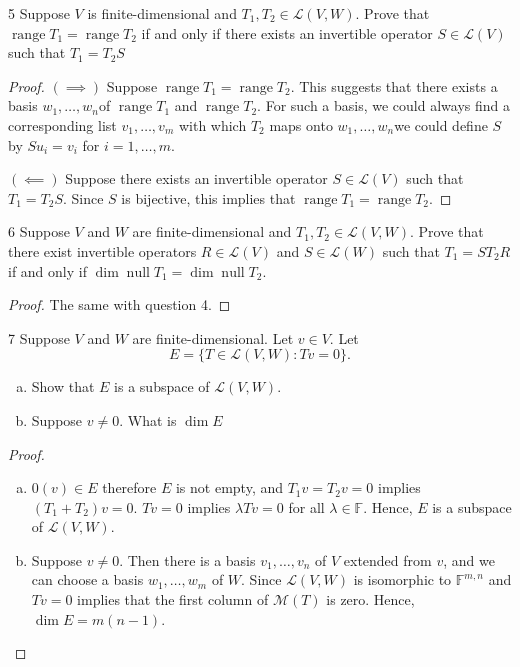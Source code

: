 \documentclass{article}
\newenvironment{problem}[1]{\begin{prob*}{#1}{}}{\end{prob*}}
\newcommand{\F}{\mathbb{F}}
\DeclareMathOperator{\Null}{null}
\DeclareMathOperator{\Range}{range}
\begin{document}
\newpage

\begin{problem}{5}
Suppose $V$ is finite-dimensional and $T_1, T_2 \in \mathcal{L}(V,W)$. Prove that $\Range T_1 = \Range T_2$ if and only if there exists an invertible operator $S \in \mathcal{L}(V)$ such that $T_1 = T_2S$
\end{problem}
\begin{proof}
	$(\implies)$ Suppose $\Range T_1 = \Range T_2$. This suggests that there exists a basis $w_1, \ldots ,w_n$of $\Range T_1$ and $\Range T_2$. For such a basis, we could always find a corresponding list $v_1, \ldots ,v_m$ with which $T_2$ maps onto $w_1, \ldots ,w_n$we could define $S$ by $Su_i = v_i$ for $i = 1, \ldots, m$.

	$(\impliedby)$ Suppose there exists an invertible operator $S \in \mathcal{L}(V)$ such that $T_1 = T_2S$. Since $S$ is bijective, this implies that $\Range T_1 = \Range T_2$.
\end{proof}

\begin{problem}{6}
Suppose $V$ and $W$ are finite-dimensional and $T_1, T_2 \in \mathcal{L}(V,W)$. Prove that there exist invertible operators $R \in \mathcal{L}(V)$ and $S \in \mathcal{L}(W)$ such that $T_1 = ST_2R $ if and only if $\operatorname{dim}\Null T_1 = \operatorname{dim}\Null T_2$.
\end{problem}
\begin{proof}
	The same with question 4.
\end{proof}

\begin{problem}{7}
Suppose $V$ and $W$ are finite-dimensional. Let $v \in V$. Let \[
	E = \{T \in \mathcal{L}(V,W) : Tv = 0\}.\]
\begin{enumerate}[(a)]
	\item Show that $E$ is a subspace of $\mathcal{L}(V,W)$.
	\item Suppose $v \neq 0.$ What is $\operatorname{dim} E$
\end{enumerate}
\end{problem}
\begin{proof}
	\begin{enumerate}[(a)]
		\item $0(v) \in E$ therefore $E$ is not empty, and $T_1v = T_2v = 0$ implies $(T_1 + T_2)v = 0$. $Tv = 0$ implies $\lambda Tv = 0$ for all $\lambda \in \F$. Hence, $E$ is a subspace of $\mathcal{L}(V,W)$.
		\item Suppose $v \neq 0$. Then there is a basis $v_1, \ldots ,v_n$ of $V$ extended from $v$, and we can choose a basis $w_1, \ldots, w_m$ of $W$. Since $\mathcal{L}(V,W)$ is isomorphic to $\mathbb{F}^{m,n}$ and $Tv = 0$ implies that the first column of $\mathcal{M}(T)$ is zero. Hence, $\operatorname{dim} E = m(n-1)$.
	\end{enumerate}
\end{proof}
\end{document}
